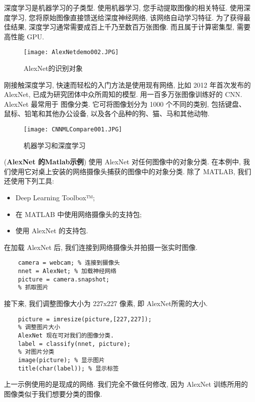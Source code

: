 深度学习是机器学习的子类型. 使用机器学习, 您手动提取图像的相关特征. 使用深度学习, 您将原始图像直接馈送给深度神经网络, 该网络自动学习特征.
为了获得最佳结果, 深度学习通常需要成百上千乃至数百万张图像. 而且属于计算密集型, 需要高性能 GPU.
\begin{figure}[H]
\centering
\texttt{[image: AlexNetdemo002.JPG]}
\caption{AlexNet的识别对象}
\label{AlexNetdemo002}
\vspace{-0.4cm}
\end{figure}
刚接触深度学习, 快速而轻松的入门方法是使用现有网络, 比如 2012 年首次发布的AlexNet, 已成为研究团体中众所周知的模型. 用一百多万张图像训练好的 CNN.  AlexNet 最常用于
图像分类. 它可将图像划分为 1000 个不同的类别, 包括键盘、鼠标、铅笔和其他办公设备, 以及各个品种的狗、猫、马和其他动物.
\begin{figure}[H]
    \centering
    \texttt{[image: CNNMLCompare001.JPG]}
    \caption{机器学习和深度学习}
    \label{CNNMLCompare001}
    \vspace{-0.4cm}
\end{figure}
\begin{example}
(\textbf{AlexNet 的Matlab示例}) 使用 AlexNet 对任何图像中的对象分类. 在本例中, 我们使用它对桌上安装的网络摄像头捕获的图像中的对象分类. 除了 MATLAB, 我们还使用下列工具:
\begin{itemize}
\item Deep Learning Toolbox™;
\item 在 MATLAB 中使用网络摄像头的支持包;
\item 使用 AlexNet 的支持包.
\end{itemize}
在加载 AlexNet 后, 我们连接到网络摄像头并拍摄一张实时图像.
\begin{Verbatim}
    camera = webcam; % 连接到摄像头
    nnet = AlexNet; % 加载神经网络
    picture = camera.snapshot;
    % 抓取图片
\end{Verbatim}
接下来, 我们调整图像大小为 227x227 像素, 即 AlexNet所需的大小.
\begin{Verbatim}
    picture = imresize(picture,[227,227]);
    % 调整图片大小
    AlexNet 现在可对我们的图像分类.
    label = classify(nnet, picture);
    % 对图片分类
    image(picture); % 显示图片
    title(char(label)); % 显示标签
\end{Verbatim}
\end{example}
上一示例使用的是现成的网络. 我们完全不做任何修改, 因为 AlexNet 训练所用的图像类似于我们想要分类的图像.

